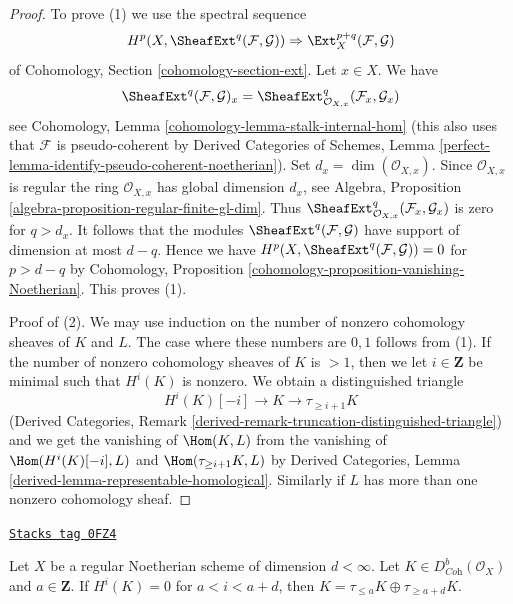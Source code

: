 \begin{proof}
To prove (1) we use the spectral sequence
$$
H^p(X, \SheafExt^q(\mathcal{F}, \mathcal{G})) \Rightarrow
\Ext^{p + q}_X(\mathcal{F}, \mathcal{G})
$$
of Cohomology, Section \ref{cohomology-section-ext}. Let $x \in X$.
We have
$$
\SheafExt^q(\mathcal{F}, \mathcal{G})_x =
\SheafExt^q_{\mathcal{O}_{X, x}}(\mathcal{F}_x, \mathcal{G}_x)
$$
see Cohomology, Lemma \ref{cohomology-lemma-stalk-internal-hom}
(this also uses that $\mathcal{F}$ is pseudo-coherent by
Derived Categories of Schemes, Lemma
\ref{perfect-lemma-identify-pseudo-coherent-noetherian}).
Set $d_x = \dim(\mathcal{O}_{X, x})$.
Since $\mathcal{O}_{X, x}$ is regular the ring
$\mathcal{O}_{X, x}$ has global dimension $d_x$, see
Algebra, Proposition \ref{algebra-proposition-regular-finite-gl-dim}.
Thus $\SheafExt^q_{\mathcal{O}_{X, x}}(\mathcal{F}_x, \mathcal{G}_x)$
is zero for $q > d_x$. It follows that the modules
$\SheafExt^q(\mathcal{F}, \mathcal{G})$ have support
of dimension at most $d - q$. Hence we have
$H^p(X, \SheafExt^q(\mathcal{F}, \mathcal{G})) = 0$ for $p > d - q$
by Cohomology, Proposition \ref{cohomology-proposition-vanishing-Noetherian}.
This proves (1).

\medskip\noindent
Proof of (2).
We may use induction on the number of nonzero cohomology sheaves
of $K$ and $L$. The case where these numbers are $0, 1$ follows
from (1). If the number of nonzero cohomology sheaves of $K$
is $> 1$, then we let $i \in \mathbf{Z}$ be minimal such that
$H^i(K)$ is nonzero. We obtain a distinguished triangle
$$
H^i(K)[-i] \to K \to \tau_{\geq i + 1}K
$$
(Derived Categories, Remark
\ref{derived-remark-truncation-distinguished-triangle})
and we get the vanishing of $\Hom(K, L)$ from the vanishing
of $\Hom(H^i(K)[-i], L)$ and $\Hom(\tau_{\geq i + 1}K, L)$
by Derived Categories, Lemma \ref{derived-lemma-representable-homological}.
Similarly if $L$ has more than one nonzero cohomology sheaf.
\end{proof}

\begin{lemma}
\label{equiv-lemma-split-complex-regular}
\href{https://stacks.math.columbia.edu/tag/0FZ4}{\texttt{Stacks tag 0FZ4}}

Let $X$ be a regular Noetherian scheme of dimension $d < \infty$.
Let $K \in D^b_{\textit{Coh}}(\mathcal{O}_X)$ and $a \in \mathbf{Z}$.
If $H^i(K) = 0$ for $a < i < a + d$, then
$K = \tau_{\leq a}K \oplus \tau_{\geq a + d}K$.
\end{lemma}

